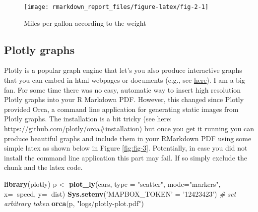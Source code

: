 \documentclass[
  12pt,
]{article}
\newenvironment{Shaded}{\begin{snugshade}}{\end{snugshade}}
\newcommand{\CommentTok}[1]{\textcolor[rgb]{0.56,0.35,0.01}{\textit{#1}}}
\newcommand{\DataTypeTok}[1]{\textcolor[rgb]{0.13,0.29,0.53}{#1}}
\newcommand{\KeywordTok}[1]{\textcolor[rgb]{0.13,0.29,0.53}{\textbf{#1}}}
\newcommand{\NormalTok}[1]{#1}
\newcommand{\OperatorTok}[1]{\textcolor[rgb]{0.81,0.36,0.00}{\textbf{#1}}}
\newcommand{\StringTok}[1]{\textcolor[rgb]{0.31,0.60,0.02}{#1}}
\begin{document}
\begin{figure}[H]

{\centering \texttt{[image: rmarkdown\_report\_files/figure-latex/fig-2-1]} 

}

\caption{Miles per gallon according to the weight}\label{fig:fig-2}
\end{figure}

\hypertarget{plotly-graphs}{%
\subsection{Plotly graphs}\label{plotly-graphs}}

Plotly is a popular graph engine that let's you also produce interactive graphs that you can embed in html webpages or documents (e.g., see \href{https://paulcbauer.shinyapps.io/visualizing-causal-scenarios/}{here}). I am a big fan. For some time there was no easy, automatic way to insert high resolution Plotly graphs into your R Markdown PDF. However, this changed since Plotly provided Orca, a command line application for generating static images from Plotly graphs. The installation is a bit tricky (see here: \url{https://github.com/plotly/orca\#installation}) but once you get it running you can produce beautiful graphs and include them in your RMarkdown PDF using some simple latex as shown below in Figure \ref{fig:fig-3}. Potentially, in case you did not install the command line application this part may fail. If so simply exclude the chunk and the latex code.

\begin{Shaded}
\begin{Highlighting}[]
\KeywordTok{library}\NormalTok{(plotly)}
\NormalTok{p <-}\StringTok{ }\KeywordTok{plot_ly}\NormalTok{(cars, }\DataTypeTok{type =} \StringTok{"scatter"}\NormalTok{, }\DataTypeTok{mode=}\StringTok{"markers"}\NormalTok{,}
        \DataTypeTok{x=}\OperatorTok{~}\NormalTok{speed,}
        \DataTypeTok{y=}\OperatorTok{~}\NormalTok{dist)}
\KeywordTok{Sys.setenv}\NormalTok{(}\StringTok{'MAPBOX_TOKEN'}\NormalTok{ =}\StringTok{ '12423423'}\NormalTok{) }\CommentTok{# set arbitrary token}
\KeywordTok{orca}\NormalTok{(p, }\StringTok{"logs/plotly-plot.pdf"}\NormalTok{)}
\end{Highlighting}
\end{Shaded}
\end{document}
